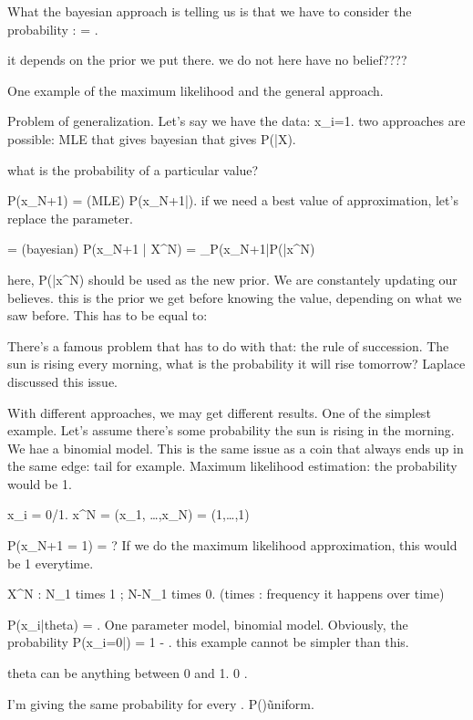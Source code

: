 \documentclass[a4paper]{tufte-book}
\begin{document}
What the bayesian approach is telling us is that we have to consider the
probability :
 = .

it depends on the prior we put there. we do not here have no belief????

One example of the maximum likelihood and the general approach.

Problem of generalization.
Let's say we have the data:
x_{i=1\ldotsN}. two approaches are possible:
MLE that gives \hat\theta
bayesian that gives P(\theta|X).

what is the probability of a particular value?

P(x_{N+1}) = (MLE) P(x_{N+1}|\hat\theta). if we need a best value of approximation, let's replace the parameter.

= (bayesian) P(x_{N+1} | X^N) = \sum_\theta P(x_{N+1}|\theta P(\theta |x^N)

    here, P(\theta |x^N) should be used as the new prior. We are constantely updating our believes. this is the prior we get before knowing the
    value,
    depending on what we saw before. This has to be equal to:

There's a famous problem that has to do with that: the rule of succession.
The sun is rising every morning, what is the probability it will rise tomorrow?
Laplace discussed this issue.

With different approaches, we may get different results. One of the simplest
example.
Let's assume there's some probability \theta the sun is rising in the morning.
We hae a binomial model. This is the same issue as a coin that always ends up
in the same edge: tail for example.
Maximum likelihood estimation: the probability would be 1.

x_i = 0/1.
x^N = (x_1, \ldots ,x_N) = (1,\ldots,1)

P(x_{N+1} = 1) = ?
If we do the maximum likelihood approximation, this would be 1 everytime.

X^N : N_1 times 1 ; N-N_1 times 0. (times : frequency it happens over time)

P(x_i|theta) = \theta. One parameter model, binomial model.
Obviously, the probability P(x_i=0|\theta) = 1 - \theta. this example cannot be
simpler than this.


theta can be anything between 0 and 1. 0 \leq \theta {}.

I'm giving the same probability for every \theta. P(\theta)\~ uniform.
\end{document}

